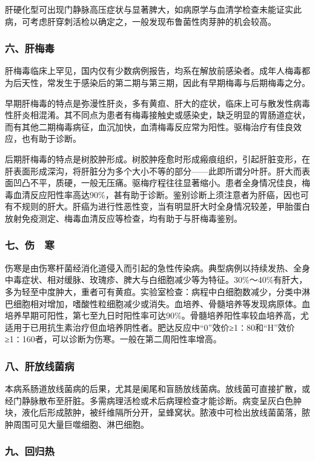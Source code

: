 肝硬化型可出现门静脉高压症状与显著脾大，如病原学与血清学检查未能证实此病，可考虑肝穿刺活检以确定之，一般发现布鲁菌性肉芽肿的机会较高。

\subsubsection{六、肝梅毒}

肝梅毒临床上罕见，国内仅有少数病例报告，均系在解放前感染者。成年人梅毒都为后天性，常发生于感染后的第二期与第三期，因此有早期梅毒与后期梅毒之分。

早期肝梅毒的特点是弥漫性肝炎，多有黄疸、肝大的症状，临床上可与散发性病毒性肝炎相混淆。其不同点为患者有梅毒接触史或感染史，缺乏明显的胃肠道症状，而有其他二期梅毒病征，血沉加快，血清梅毒反应常为阳性。驱梅治疗有佳良效应，也有助于诊断。

后期肝梅毒的特点是树胶肿形成。树胶肿痊愈时形成瘢痕组织，引起肝脏变形，在肝表面形成深沟，将肝脏分为多个大小不等的部分------此即所谓分叶肝。肝大而表面凹凸不平，质硬，一般无压痛。驱梅疗程往往显著缩小。患者全身情况佳良，梅毒血清反应阳性率高达90\%，甚有助于诊断。鉴别诊断上须注意者为肝癌，因也可有不规则的肝大。肝癌为进行性恶性变，当有明显肝大时全身情况较差，甲胎蛋白放射免疫测定、梅毒血清反应等检查，均有助于与肝梅毒鉴别。

\subsubsection{七、伤　寒}

伤寒是由伤寒杆菌经消化道侵入而引起的急性传染病。典型病例以持续发热、全身中毒症状、相对缓脉、玫瑰疹、脾大与白细胞减少等为特征。30\%～40\%有肝大，多为轻至中度肿大，重者可有黄疸。实验室检查：病程中白细胞数减少，分类中淋巴细胞相对增加，嗜酸性粒细胞减少或消失。血培养、骨髓培养等发现病原体。血培养早期可阳性，第七至九日时阳性率可达90\%。骨髓培养阳性率较血培养高，尤适用于已用抗生素治疗但血培养阴性者。肥达反应中“0”效价≥1∶80和“H”效价≥1∶160者，可以诊断为伤寒。一般在第二周阳性率增高。

\subsubsection{八、肝放线菌病}

本病系肠道放线菌病的后果，尤其是阑尾和盲肠放线菌病。放线菌可直接扩散，或经门静脉散布至肝脏。多需病理活检或术后病理检查才能诊断。病变呈灰白色肿块，液化后形成脓肿，被纤维隔所分开，呈蜂窝状。脓液中可检出放线菌菌落，脓肿周围可见大量巨噬细胞、淋巴细胞。

\subsubsection{九、回归热}

